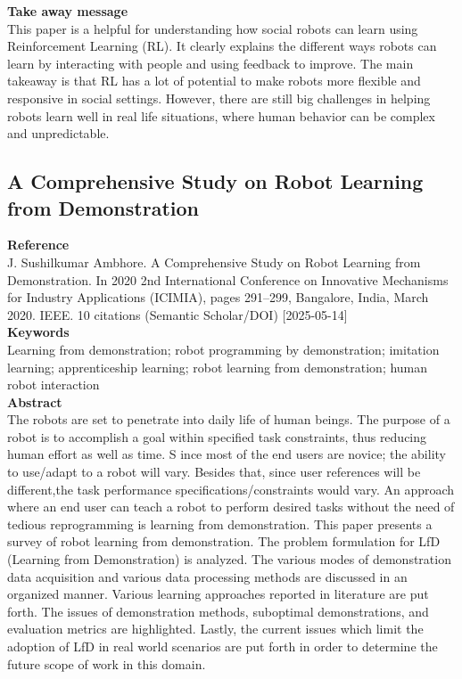 \documentclass[report.tex]{subfiles}
\begin{document}
\noindent\textbf{Take away message}  \\
This paper is a helpful for understanding how social robots can learn using Reinforcement Learning (RL). It clearly explains the different ways robots can learn by interacting with people and using feedback to improve. The main takeaway is that RL has a lot of potential to make robots more flexible and responsive in social settings. However, there are still big challenges in helping robots learn well in real life situations, where human behavior can be complex and unpredictable.













\subsection{A Comprehensive Study on Robot Learning from Demonstration} 

\noindent\textbf{Reference} \\
\cite{ambhore_comprehensive_2020}J. Sushilkumar Ambhore. A Comprehensive Study on Robot Learning from Demonstration. In 2020 2nd International Conference on Innovative Mechanisms for Industry Applications (ICIMIA), pages 291–299, Bangalore, India, March 2020. IEEE. 10 citations (Semantic Scholar/DOI) [2025-05-14]
\\


\noindent\textbf{Keywords} \\
Learning from demonstration; robot programming by demonstration; imitation learning; apprenticeship learning; robot learning from demonstration; human robot interaction
   \\

\noindent\textbf{Abstract} \\
The robots are set to penetrate into daily life of human beings. The purpose of a robot is to accomplish a goal within specified task constraints, thus reducing human effort as well as time. S ince most of the end users are novice; the ability to use/adapt to a robot will vary. Besides that, since user references will be different,the task performance specifications/constraints would vary. An approach where an end user can teach a robot to perform desired tasks without the need of tedious reprogramming is learning from demonstration. This paper presents a survey of robot learning from demonstration. The problem formulation for LfD (Learning from Demonstration) is analyzed. The various modes of demonstration data acquisition and various data processing methods are discussed in an organized manner. Various learning approaches reported in literature are put forth. The issues of demonstration methods, suboptimal demonstrations, and evaluation metrics are highlighted. Lastly, the current issues which limit the adoption of LfD in real world scenarios are put forth in order to determine the future scope of work in this domain.
\\
\end{document}
